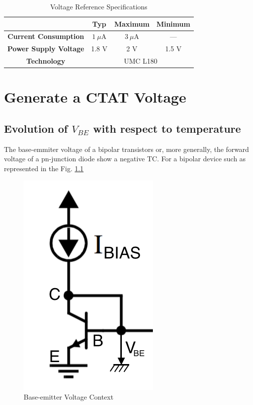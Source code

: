 \documentclass[11pt,a4paper]{report}
\begin{document}
\begin{table}[h]
  \begin{center}
  \begin{tabular}{|c|c|c|c|} \hline
                                 & Typ & Maximum       & Minimum \\ \hline
    \textbf{Current Consumption} & $1~\mu$A & $3~\mu$A &   ---     \\ \hline
    \textbf{Power Supply Voltage}& 1.8 V    & 2 V      & 1.5 V \\ \hline \hline
    \textbf{Technology}          & \multicolumn{3}{c|}{UMC L180}  \\ \hline
  \end{tabular}
\end{center}
\caption{Voltage Reference Specifications}
\end{table}


\chapter{Generate a CTAT Voltage}
\section{Evolution of $V_{BE}$ with respect to temperature}

The base-emmiter voltage of a bipolar transistors or, more generally, the forward voltage of a pn-junction diode show a negative TC. For a bipolar device such as represented in the Fig. \ref{vbe_T} 

\begin{figure}[h]
  \begin{center}
    \includegraphics[scale=0.3]{photo/CTAT_VBE}
  \end{center}
  \caption{Base-emitter Voltage Context}
  \label{vbe_T}
\end{figure}
\end{document}
